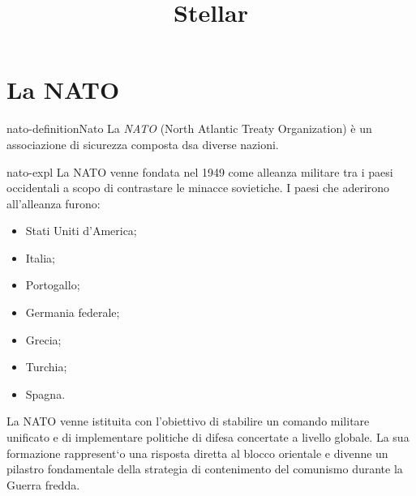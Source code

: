 \documentclass[preview]{standalone}
\begin{document}
\title{Stellar}
\genpage

\section{La NATO}

\begin{snippetdefinition}{nato-definition}{Nato}
    La \textit{NATO} (North Atlantic Treaty Organization) è un associazione di sicurezza composta dsa diverse nazioni.
\end{snippetdefinition}

\begin{snippet}{nato-expl}
    La NATO venne fondata nel 1949 come alleanza militare
    tra i paesi occidentali a scopo di contrastare le minacce sovietiche.
    I paesi che aderirono all'alleanza furono:
    \begin{itemize}
        \item Stati Uniti d'America;
        \item Italia;
        \item Portogallo;
        \item Germania federale;
        \item Grecia;
        \item Turchia;
        \item Spagna.
    \end{itemize}
    La NATO venne istituita con l'obiettivo di stabilire un comando militare unificato e di implementare politiche
    di difesa concertate a livello globale. La sua formazione rappresent`o una risposta diretta al blocco orientale e
    divenne un pilastro fondamentale della strategia di contenimento del comunismo durante la Guerra fredda.
\end{snippet}
\end{document}
